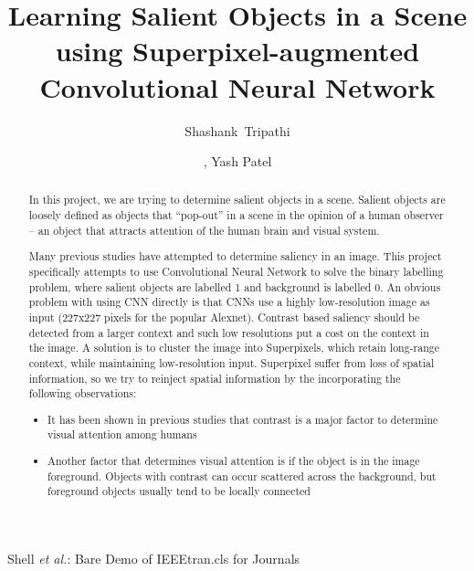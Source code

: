 \documentclass[journal]{IEEEtran}
\begin{document}
%
\title{Learning Salient Objects in a Scene using Superpixel-augmented Convolutional Neural Network}
%
%
%

\author{Shashank~Tripathi\and, Yash Patel}


\markboth{}%
{Shell \MakeLowercase{\textit{et al.}}: Bare Demo of IEEEtran.cls for Journals}

\maketitle


\begin{abstract}
In this project, we are trying to determine salient objects in a scene. Salient objects are loosely defined as objects that “pop-out” in a scene in the opinion of a human observer -- an object that attracts attention of the human brain and visual system. 

Many previous studies have attempted to determine saliency in an image. This project specifically attempts to use Convolutional Neural Network to solve the binary labelling problem, where salient objects are labelled 1 and background is labelled 0. An obvious problem with using CNN directly is that CNNs use a highly low-resolution image as input (227x227 pixels for the popular Alexnet). Contrast based saliency should be detected from a larger context and such low resolutions put a cost on the context in the image. A solution is to cluster the image into Superpixels, which retain long-range context, while maintaining low-resolution input. Superpixel suffer from loss of spatial information, so we try to reinject spatial information by the incorporating the following observations: 
\begin{itemize}
	\item It has been shown in previous studies that contrast is a major factor to determine visual attention among humans	
	\item Another factor that determines visual attention is if the object is in the image foreground. Objects with contrast can occur scattered across the background, but foreground objects usually tend to be locally connected
\end{itemize}


\end{abstract}
\end{document}
